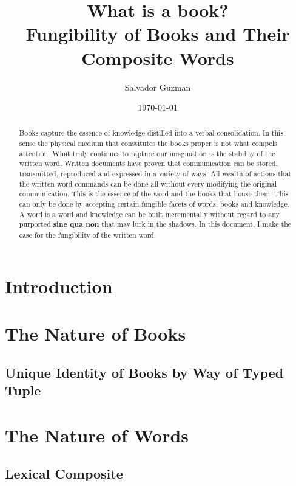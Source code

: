 \documentclass[12pt]{article}
\begin{document}
\title{What is a book?\\
\large Fungibility of Books and Their Composite Words}
\author{Salvador Guzman}
\date{\today}

\maketitle
\newpage

\begin{abstract}
Books capture the essence of knowledge distilled into a verbal consolidation. In
this sense the physical medium that constitutes the books proper is not what
compels attention. What truly continues to rapture our imagination is the
stability of the written word. Written documents have proven that communication
can be stored, transmitted, reproduced and expressed in a variety of ways. All
wealth of actions that the written word commands can be done all without every
modifying the original communication. This is the essence of the word and the
books that house them. This can only be done by accepting certain fungible
facets of words, books and knowledge. A word is a word and knowledge can be
built incrementally without regard to any purported \textbf{sine qua non} that may
lurk in the shadows. In this document, I make the case for the fungibility of
the written word.
\end{abstract}

\newpage

\tableofcontents
\newpage

\section{Introduction}

\section{The Nature of Books}
\subsection{Unique Identity of Books by Way of Typed Tuple}

\section{The Nature of Words}
\subsection{Lexical Composite}
\end{document}
